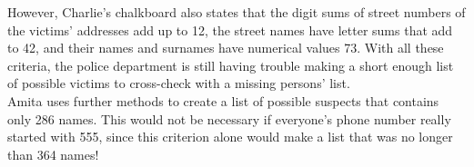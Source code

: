 However, Charlie's chalkboard also states that the digit sums of street numbers of the victims' addresses add up to 12, the street names have letter sums that add to 42, and their names and surnames have numerical values 73. With all these criteria, the police department is still having trouble making a short enough list of possible victims to cross-check with a missing persons' list. \\

Amita uses further methods to create a list of possible suspects that contains only 286 names. This would not be necessary if everyone's phone number really started with 555, since this criterion alone would make a list that was no longer than 364 names! \\

 \vspace{0.2cm}






















